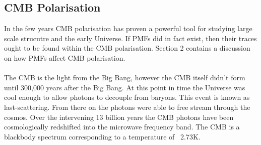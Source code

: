 \subsection{CMB Polarisation}
In the few years CMB polarisation has proven a powerful tool for studying large scale strucutre and the early Universe. If PMFs did in fact exist, then their traces ought to be found within the CMB polarisation. Section 2 contains a discussion on how PMFs affect CMB polarisation.
\\\\
The CMB is the light from the Big Bang, however the CMB itself didn't form until 300,000 years after the Big Bang. At this point in time the Universe was cool enough to allow photons to decouple from baryons. This event is known as last-scattering. From there on the photons were able to free stream through the cosmos. Over the intervening 13 billion years the CMB photons have been cosmologically redshifted into the microwave frequency band. The CMB is a blackbody spectrum corresponding to a temperature of ~2.73K.

